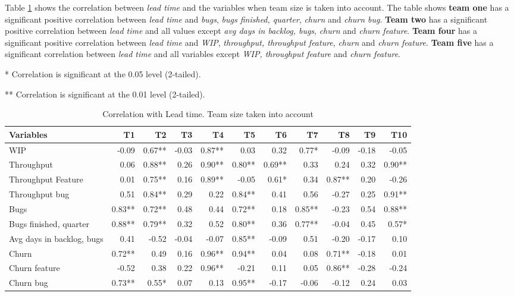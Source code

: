 \documentclass[UKenglish]{ifimaster}  %
\begin{document}
Table \ref{corr:LT:V2} shows the correlation between \textit{lead time} and the variables when team size is taken into account. The table shows \textbf{team one} has a significant positive correlation between \textit{lead time} and \textit{bugs}, \textit{bugs finished, quarter}, \textit{churn} and \textit{churn bug}. \textbf{Team two} has a significant positive correlation between \textit{lead time} and all values except \textit{avg days in backlog, bugs}, \textit{churn} and \textit{churn feature}.  \textbf{Team four} has a significant positive correlation between \textit{lead time} and \textit{WIP}, \textit{throughput, throughput feature}, \textit{churn} and \textit{churn feature}. \textbf{Team five} has a significant correlation between \textit{lead time} and all variables except \textit{WIP, throughput feature} and \textit{churn feature}.


\begin{table}[H]
 \caption{Correlation with Lead time. Team size taken into account}
 \centerline {* Correlation is significant at the 0.05 level (2-tailed).}
\centerline{** Correlation is significant at the 0.01 level (2-tailed).}
  \begin{adjustwidth}{-2cm}{}
 \centering
 \begin{tabular}{|l|r|r|r|r|r|r|r|r|r|r|}
\hline
 \textbf{Variables} & \bf{T1} & \bf{T2} & \bf{T3} & \bf{T4} & \bf{T5} & \bf{T6} & \bf{T7} & \bf{T8} & \bf{T9} & \bf{T10}\\ \hline
 WIP  & -0.09 & 0.67** & -0.03 & 0.87** & 0.03 & 0.32 & 0.77* & -0.09 & -0.18 & -0.05 \\ \hline
 Throughput  & 0.06 & 0.88** & 0.26 & 0.90** & 0.80** & 0.69** & 0.33 & 0.24 & 0.32 & 0.90** \\ \hline
 Throughput Feature  & 0.01 & 0.75** & 0.16 & 0.89** & -0.05 & 0.61* & 0.34 & 0.87** & 0.20 & -0.26 \\ \hline
 Throughput bug  & 0.51 & 0.84** & 0.29 & 0.22 & 0.84** & 0.41 & 0.56 & -0.27 & 0.25 & 0.91** \\ \hline
 Bugs  & 0.83** & 0.72** & 0.48 & 0.44 & 0.72** & 0.18 & 0.85** & -0.23 & 0.54 & 0.88** \\ \hline
 Bugs finished, quarter  & 0.88** & 0.79** & 0.32 & 0.52 & 0.80** & 0.36 & 0.77** & -0.04 & 0.45 & 0.57* \\ \hline
 Avg days in backlog, bugs  & 0.41 & -0.52 & -0.04 & -0.07 & 0.85** & -0.09 & 0.51 & -0.20 & -0.17 & 0.10 \\ \hline
 Churn  & 0.72** & 0.49 & 0.16 & 0.96** & 0.94** & 0.04 & 0.08 & 0.71** & -0.18 & 0.01 \\ \hline
 Churn feature  & -0.52 & 0.38 & 0.22 & 0.96** & -0.21 & 0.11 & 0.05 & 0.86** & -0.28 & -0.24 \\ \hline
 Churn bug  & 0.73** & 0.55* & 0.07 & 0.13 & 0.95** & -0.17 & -0.06 & -0.12 & 0.24 & 0.03 \\ \hline
\end{tabular}
 \label{corr:LT:V2}

\end{adjustwidth}
\end{table}
\end{document}
